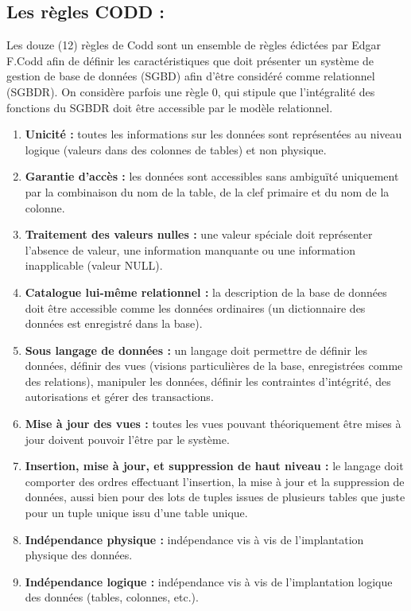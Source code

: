 \subsection{Les règles CODD :}

Les douze (12) règles de Codd sont un ensemble de règles édictées par Edgar F.Codd afin de définir les caractéristiques que doit présenter un système de gestion de base de données (SGBD) afin d'être considéré comme relationnel (SGBDR). On considère parfois une règle 0, qui stipule que l'intégralité des fonctions du SGBDR doit être accessible par le modèle relationnel.

\begin{enumerate}
\item \textbf{Unicité :} toutes les informations sur les données sont représentées au niveau logique (valeurs dans des colonnes de tables) et non physique.
\item \textbf{Garantie d'accès :} les données sont accessibles sans ambiguïté uniquement par la combinaison du nom de la table, de la clef primaire et du nom de la colonne.
\item \textbf{Traitement des valeurs nulles :} une valeur spéciale doit représenter l'absence de valeur, une information manquante ou une information inapplicable (valeur NULL).
\item \textbf{Catalogue lui-même relationnel :} la description de la base de données doit être accessible comme les données ordinaires (un dictionnaire des données est enregistré dans la base).
\item \textbf{Sous langage de données :} un langage doit permettre de définir les données, définir des vues (visions particulières de la base, enregistrées comme des relations), manipuler les données, définir les contraintes d'intégrité, des autorisations et gérer des transactions.
\item \textbf{Mise à jour des vues :} toutes les vues pouvant théoriquement être mises à jour doivent pouvoir l'être par le système.
\item \textbf{Insertion, mise à jour, et suppression de haut niveau :} le langage doit comporter des ordres effectuant l'insertion, la mise à jour et la suppression de données, aussi bien pour des lots de tuples issues de plusieurs tables que juste pour un tuple unique issu d'une table unique.
\item \textbf{Indépendance physique :} indépendance vis à vis de l'implantation physique des données.
\item \textbf{Indépendance logique :} indépendance vis à vis de l'implantation logique des données (tables, colonnes, etc.).

\end{enumerate}
